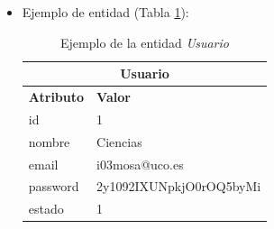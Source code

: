 \begin{itemize}
    \item Ejemplo de entidad (Tabla \ref{table:T-Usuario}):

    \begin{table}[H]
    \centering
        \begin{tabular}{ |p{6cm}||p{6cm}|  }
             \hline
                \multicolumn{2}{|c|}{\textbf{Usuario}} \\
             \hline
                 \textbf{Atributo} & \textbf{Valor} \\
             \hline
                 id & 1 \\
             \hline
                 nombre & Ciencias \\
             \hline
                 email & i03mosa@uco.es \\
            \hline
                 password & 2y1092IXUNpkjO0rOQ5byMi \\
             \hline
                 estado & 1 \\
        \end{tabular}
        \caption{Ejemplo de la entidad \textit{Usuario}}
        \label{table:T-Usuario}
    \end{table}
\end{itemize}


